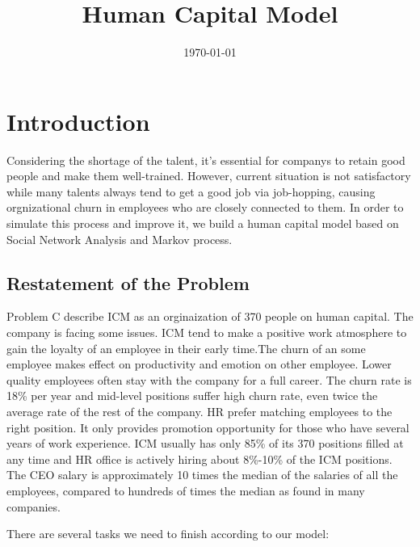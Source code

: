 \documentclass[12pt,a4paper,titlepage]{article}
\begin{document}
\title{Human Capital Model} \date{\today{}}
\maketitle

\tableofcontents

\newpage

\section{Introduction}
\label{sec:introduction}

Considering the shortage of the talent, it's essential for companys to
retain good people and make them well-trained. However, current
situation is not satisfactory while many talents always tend to get a
good job via job-hopping, causing orgnizational churn in employees who
are closely connected to them. In order to simulate this process and
improve it, we build a human capital model based on Social Network
Analysis and Markov process.

\subsection{Restatement of the Problem}
\label{sec:restatement-of-the-problem}

Problem C describe ICM as an orginaization of 370 people on human
capital. The company is facing some issues. ICM tend to make a
positive work atmosphere to gain the loyalty of an employee in their
early time.The churn of an some employee makes effect on productivity
and emotion on other employee. Lower quality employees often stay with
the company for a full career. The churn rate is 18\% per year and
mid-level positions suffer high  churn rate, even twice the average
rate of the rest of the company. HR prefer matching employees to the
right position. It only provides promotion opportunity for those who
have several years of work experience. ICM usually has only 85\% of
its 370 positions filled at any time and HR office is actively hiring
about 8\%-10\% of the ICM positions. The CEO salary is approximately
10 times the median of the salaries of all the employees, compared to
hundreds of times the median as found in many companies.

There are several tasks we need to finish according to our model:
\end{document}
